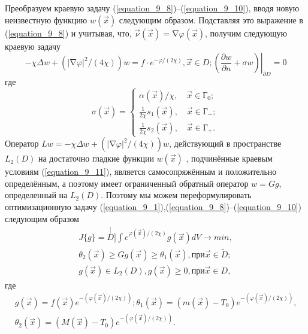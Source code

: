 Преобразуем краевую задачу (\ref{equation_9_8})--(\ref{equation_9_10}), вводя новую неизвестную функцию $w(\vec x)$ следующим образом. Подставляя это выражение в (\ref{equation_9_8}) и учитывая, что, $\vec\nu(\vec x){=}\mathop{\nabla}\varphi(\vec x)$, получим следующую краевую задачу
         \begin{equation} \label{equation_9_11}
        -\chi\Delta w+\left(\left|\mathop{\nabla}\varphi\right|^2/(4\chi) \right)w=f\cdot e^{-\varphi/(2\chi)},\vec x{\in} D;\left.\left(\frac{\partial w}{\partial n}+\sigma w\right)\right|_{\partial D}{=}0
         \end{equation}
где
        \begin{equation*}
        \sigma(\vec{x})=
        \begin{cases}
        \displaystyle\alpha(\vec x)/\chi,\quad\vec x\in \text{Г}_0;\\
        \displaystyle\left.\frac{1}{2\chi}s_1(\vec x),\right.\quad\vec x\in \text{Г}_-;\\
        \displaystyle\left.\frac{1}{2\chi}s_2(\vec x),\right.\quad\vec x\in \text{Г}_+.
        \end{cases}
        \end{equation*}
Оператор $Lw{=}-\chi\Delta w{+}\left(\left|\mathop{\nabla}\varphi\right|^2/(4\chi)\right)w$, действующий в пространстве $L_2(D)$ на достаточно гладкие функции $w(\vec x)$ , подчинённые краевым условиям (\ref{equation_9_11}), является самосопряжённым и положительно определённым, а поэтому имеет ограниченный обратный оператор $w=Gg$, определенный на $L_2(D)$. Поэтому мы можем переформулировать оптимизационную задачу (\ref{equation_9_1}),(\ref{equation_9_8})--(\ref{equation_9_10}) следующим образом
        \begin{equation*}\begin{split}
        J\{g\}={\stackrel[D]{}{\int}}e^{\varphi(\vec x)/(2\chi)}g(\vec x)dV\rightarrow min,\\
        \theta_2(\vec x)\ge Gg(\vec x)\ge\theta_1(\vec x),при\vec x\in \tilde D;\\
        g(\vec x)\in L_2(D), g(\vec x)\ge 0,при\vec x\in D,
         \end{split}\end{equation*}
где
            \begin{eqnarray*}
            &g(\vec x)=f(\vec x)e^{-(\varphi(\vec x)/(2\chi))};\theta_1(\vec x)=(m(\vec x)-T_0)e^{-(\varphi(\vec x)/(2\chi))},& \\
            &\theta_2(\vec x)=(M(\vec x)-T_0)e^{-(\varphi(\vec x)/(2\chi))}.&
            \end{eqnarray*}

